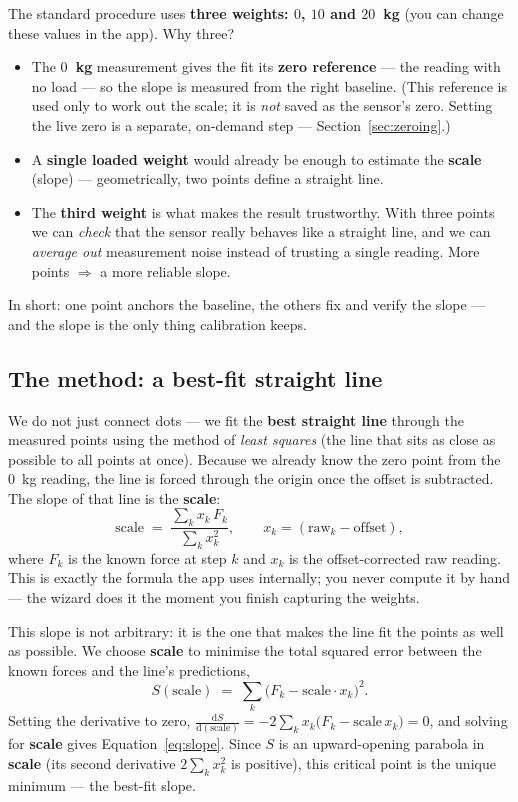 \documentclass[11pt,a4paper]{article}
\begin{document}
The standard procedure uses \textbf{three weights: $0$, $10$ and $20$~kg} (you can
change these values in the app). Why three?
\begin{itemize}[leftmargin=1.4em]
  \item The \textbf{$0$~kg} measurement gives the fit its \textbf{zero reference}
        --- the reading with no load --- so the slope is measured from the right
        baseline. (This reference is used only to work out the scale; it is
        \emph{not} saved as the sensor's zero. Setting the live zero is a separate,
        on-demand step --- Section~\ref{sec:zeroing}.)
  \item A \textbf{single loaded weight} would already be enough to estimate the
        \textbf{scale} (slope) --- geometrically, two points define a straight
        line.
  \item The \textbf{third weight} is what makes the result trustworthy. With three
        points we can \emph{check} that the sensor really behaves like a straight
        line, and we can \emph{average out} measurement noise instead of trusting
        a single reading. More points $\Rightarrow$ a more reliable slope.
\end{itemize}
In short: one point anchors the baseline, the others fix and verify the slope ---
and the slope is the only thing calibration keeps.

\subsection{The method: a best-fit straight line}
We do not just connect dots --- we fit the \textbf{best straight line} through the
measured points using the method of \emph{least squares} (the line that sits as
close as possible to all points at once). Because we already know the zero point
from the $0$~kg reading, the line is forced through the origin once the offset is
subtracted. The slope of that line is the \textbf{scale}:
\begin{equation}
  \text{scale} \;=\; \frac{\sum_k x_k\,F_k}{\sum_k x_k^{2}},
  \qquad x_k = (\text{raw}_k - \text{offset}),
  \label{eq:slope}
\end{equation}
where $F_k$ is the known force at step $k$ and $x_k$ is the offset-corrected raw
reading. This is exactly the formula the app uses internally; you never compute it
by hand --- the wizard does it the moment you finish capturing the weights.

This slope is not arbitrary: it is the one that makes the line fit the points as
well as possible. We choose \textbf{scale} to minimise the total squared error
between the known forces and the line's predictions,
\begin{equation}
  S(\text{scale}) \;=\; \sum_k \bigl(F_k - \text{scale}\cdot x_k\bigr)^2 .
  \label{eq:lsq}
\end{equation}
Setting the derivative to zero, $\frac{\mathrm{d}S}{\mathrm{d}(\text{scale})}
= -2\sum_k x_k\bigl(F_k - \text{scale}\,x_k\bigr) = 0$, and solving for
\textbf{scale} gives Equation~\eqref{eq:slope}. Since $S$ is an upward-opening
parabola in \textbf{scale} (its second derivative $2\sum_k x_k^{2}$ is positive),
this critical point is the unique minimum --- the best-fit slope.
\end{document}

